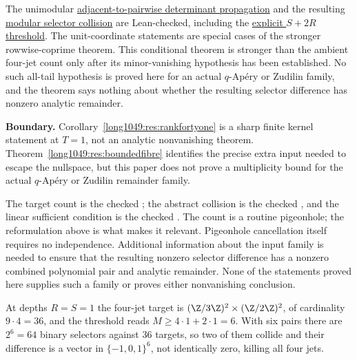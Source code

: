 \documentclass[11pt]{article}
\begin{document}
\noindent The unimodular
\href{https://github.com/wcook04/plectis-erdos/blob/0cfa24a7fe555d75a9d9e7f119da4720a88c1396/ErdosProblems/Erdos1049/BezoutPluckerJets.lean\#L191}{adjacent-to-pairwise determinant propagation}
and the resulting
\href{https://github.com/wcook04/plectis-erdos/blob/0cfa24a7fe555d75a9d9e7f119da4720a88c1396/ErdosProblems/Erdos1049/BezoutPluckerJets.lean\#L280}{modular selector collision}
are Lean-checked, including the
\href{https://github.com/wcook04/plectis-erdos/blob/0cfa24a7fe555d75a9d9e7f119da4720a88c1396/ErdosProblems/Erdos1049/BezoutPluckerJets.lean\#L299}{explicit $S+2R$ threshold}.
The unit-coordinate statements are special cases of the stronger
rowwise-coprime theorem.
This conditional theorem is stronger than the ambient four-jet count only
after its minor-vanishing hypothesis has been established.  No such all-tail
hypothesis is proved here for an actual $q$-Ap\'ery or Zudilin family, and the
theorem says nothing about whether the resulting selector difference has
nonzero analytic remainder.

\noindent\textbf{Boundary.}
Corollary~\ref{long1049:res:rankfortyone} is a sharp finite kernel statement at
$T=1$, not an analytic nonvanishing theorem.  Theorem~\ref{long1049:res:boundedfibre}
identifies the precise extra input needed to escape the nullspace, but this
paper does not prove a multiplicity bound for the actual $q$-Ap\'ery or
Zudilin remainder family.

\noindent The target count is the checked
; the abstract collision is the checked
, and the linear sufficient condition is the checked
.  The count is a routine pigeonhole; the reformulation
above is what makes it relevant.  Pigeonhole cancellation itself requires no
independence.  Additional information about the input family is needed to
ensure that the resulting nonzero selector difference has a nonzero combined
polynomial pair and analytic remainder.  None of the statements proved here
supplies such a family or proves either nonvanishing conclusion.

\begin{example}\label{long1049:ex:jetcount}
At depths \(R=S=1\) the four-jet target is
\((\Z/3\Z)^2\times(\Z/2\Z)^2\), of cardinality \(9\cdot4=36\), and the threshold
reads \(M\ge4\cdot1+2\cdot1=6\).  With six pairs there are \(2^{6}=64\) binary
selectors against \(36\) targets, so two of them collide and their difference
is a vector in \(\{-1,0,1\}^{6}\), not identically zero, killing all four jets.
\end{example}
\end{document}
